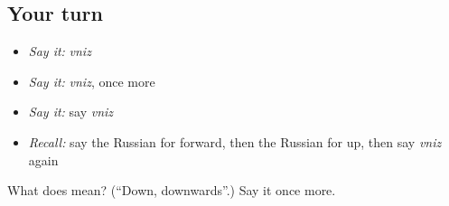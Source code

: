\subsection*{Your turn}
\begin{itemize}
\raggedright
  \item \emph{Say it:} \emph{vniz}
  \item \emph{Say it:} \emph{vniz}, once more
  \item \emph{Say it:} say \emph{vniz}
  \item \emph{Recall:} say the Russian for forward, then the Russian for up, then say \emph{vniz} again
\end{itemize}

\begin{tcolorbox}[breakable,colback=teal!4,colframe=teal!35!black,title={Before you move on}]
What does  mean? (\textquotedblleft{}Down, downwards\textquotedblright{}.) Say it once more.
\end{tcolorbox}
